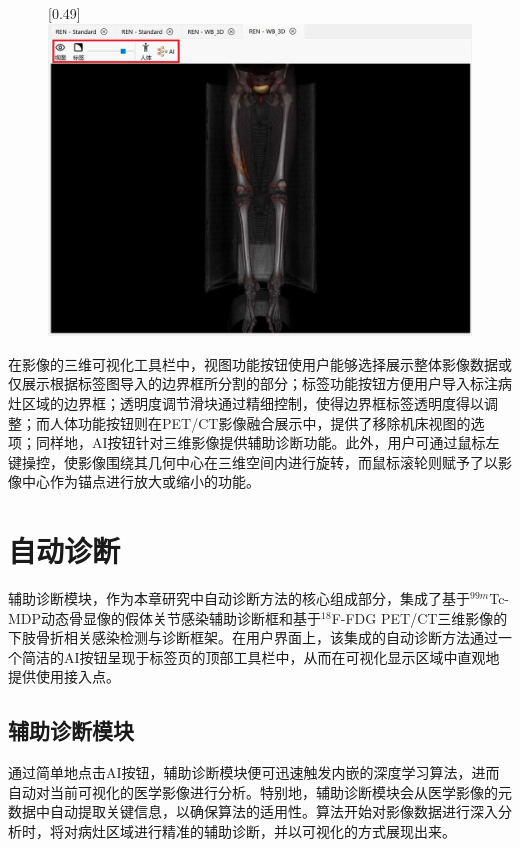 \begin{figure}[htbp]
  [0.49\textwidth]{\includegraphics[scale=0.3]{figures/chap05_view_3DF.jpg}}
  \label{fig:chap05_view}
\end{figure}

在影像的三维可视化工具栏中，视图功能按钮使用户能够选择展示整体影像数据或仅展示根据标签图导入的边界框所分割的部分；标签功能按钮方便用户导入标注病灶区域的边界框；透明度调节滑块通过精细控制，使得边界框标签透明度得以调整；而人体功能按钮则在PET/CT影像融合展示中，提供了移除机床视图的选项；同样地，AI按钮针对三维影像提供辅助诊断功能。此外，用户可通过鼠标左键操控，使影像围绕其几何中心在三维空间内进行旋转，而鼠标滚轮则赋予了以影像中心作为锚点进行放大或缩小的功能。

\section{自动诊断}

辅助诊断模块，作为本章研究中自动诊断方法的核心组成部分，集成了基于\(^{99m}\)Tc-MDP动态骨显像的假体关节感染辅助诊断框和基于\(^{18}\)F-FDG PET/CT三维影像的下肢骨折相关感染检测与诊断框架。在用户界面上，该集成的自动诊断方法通过一个简洁的AI按钮呈现于标签页的顶部工具栏中，从而在可视化显示区域中直观地提供使用接入点。

\subsection{辅助诊断模块}

通过简单地点击AI按钮，辅助诊断模块便可迅速触发内嵌的深度学习算法，进而自动对当前可视化的医学影像进行分析。特别地，辅助诊断模块会从医学影像的元数据中自动提取关键信息，以确保算法的适用性。算法开始对影像数据进行深入分析时，将对病灶区域进行精准的辅助诊断，并以可视化的方式展现出来。

